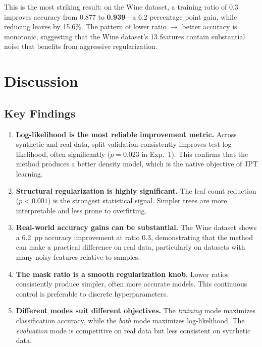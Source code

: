 \documentclass[11pt,a4paper]{article}
\begin{document}
This is the most striking result: on the Wine dataset, a training ratio of 0.3
improves accuracy from 0.877 to \textbf{0.939}---a 6.2 percentage point gain,
while reducing leaves by 15.6\%. The pattern of lower ratio $\to$ better
accuracy is monotonic, suggesting that the Wine dataset's 13 features contain
substantial noise that benefits from aggressive regularization.

\section{Discussion}
\label{sec:discussion}

\subsection{Key Findings}

\begin{enumerate}
    \item \textbf{Log-likelihood is the most reliable improvement metric.}
          Across synthetic and real data, split validation consistently
          improves test log-likelihood, often significantly ($p = 0.023$ in
          Exp.~1). This confirms that the method produces a better density
          model, which is the native objective of JPT learning.

    \item \textbf{Structural regularization is highly significant.}
          The leaf count reduction ($p < 0.001$) is the strongest statistical
          signal. Simpler trees are more interpretable and less prone to
          overfitting.

    \item \textbf{Real-world accuracy gains can be substantial.}
          The Wine dataset shows a 6.2~pp accuracy improvement at ratio 0.3,
          demonstrating that the method can make a practical difference on
          real data, particularly on datasets with many noisy features relative
          to samples.

    \item \textbf{The mask ratio is a smooth regularization knob.}
          Lower ratios consistently produce simpler, often more accurate models.
          This continuous control is preferable to discrete hyperparameters.

    \item \textbf{Different modes suit different objectives.}
          The \emph{training} mode maximizes classification accuracy, while
          the \emph{both} mode maximizes log-likelihood. The \emph{evaluation}
          mode is competitive on real data but less consistent on synthetic data.
\end{enumerate}
\end{document}
